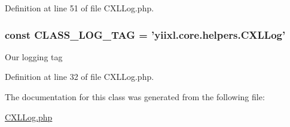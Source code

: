 Definition at line 51 of file CXLLog.php.

\hypertarget{classCXLLog_aa607ab5e557e6ebb60b85c5a20ad067f}{
\subsubsection[{CLASS\_\-LOG\_\-TAG}]{\setlength{\rightskip}{0pt plus 5cm}const {\bf CLASS\_\-LOG\_\-TAG} = 'yiixl.core.helpers.CXLLog'}}
\label{classCXLLog_aa607ab5e557e6ebb60b85c5a20ad067f}
Our logging tag 

Definition at line 32 of file CXLLog.php.



The documentation for this class was generated from the following file:\begin{DoxyCompactItemize}
\item 
\hyperlink{CXLLog_8php}{CXLLog.php}\end{DoxyCompactItemize}
